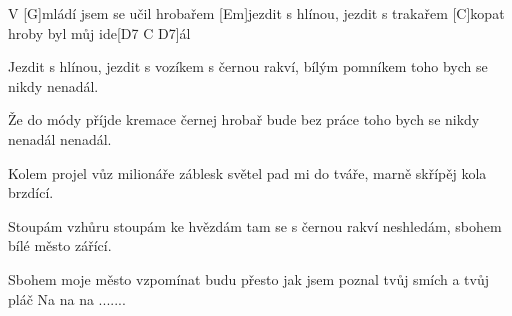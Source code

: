 
V [G]mládí jsem se učil hrobařem
[Em]jezdit s hlínou, jezdit s trakařem
[C]kopat hroby byl můj ide[D7 C D7]\null ál 

Jezdit s hlínou, jezdit s vozíkem
s černou rakví, bílým pomníkem
toho bych se nikdy nenadál.

Že do módy příjde kremace
černej hrobař bude bez práce
toho bych se nikdy nenadál nenadál.

Kolem projel vůz milionáře
záblesk světel pad mi do tváře,
marně skřípěj kola brzdící.

Stoupám vzhůru stoupám ke hvězdám
tam se s černou rakví neshledám,
sbohem bílé město zářící.

Sbohem moje město
vzpomínat budu přesto
jak jsem poznal tvůj smích a tvůj pláč Na na na .......

